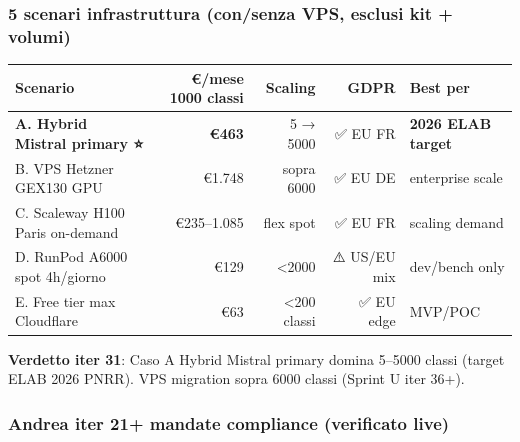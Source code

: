 \documentclass[12pt,a4paper]{article}
\begin{document}
\subsubsection*{5 scenari infrastruttura (con/senza VPS, esclusi kit + volumi)}

\begin{center}
\begin{tabular}{lrrrl}
\toprule
\textbf{Scenario} & \textbf{€/mese 1000 classi} & \textbf{Scaling} & \textbf{GDPR} & \textbf{Best per} \\
\midrule
\textbf{A. Hybrid Mistral primary ⭐} & \textbf{€463} & 5 → 5000 & ✅ EU FR & \textbf{2026 ELAB target} \\
B. VPS Hetzner GEX130 GPU & €1.748 & sopra 6000 & ✅ EU DE & enterprise scale \\
C. Scaleway H100 Paris on-demand & €235--1.085 & flex spot & ✅ EU FR & scaling demand \\
D. RunPod A6000 spot 4h/giorno & €129 & <2000 & ⚠️ US/EU mix & dev/bench only \\
E. Free tier max Cloudflare & €63 & <200 classi & ✅ EU edge & MVP/POC \\
\bottomrule
\end{tabular}
\end{center}

\textbf{Verdetto iter 31}: Caso A Hybrid Mistral primary domina 5--5000 classi (target ELAB 2026 PNRR). VPS migration sopra 6000 classi (Sprint U iter 36+).

\subsubsection*{Andrea iter 21+ mandate compliance (verificato live)}

\end{document}
